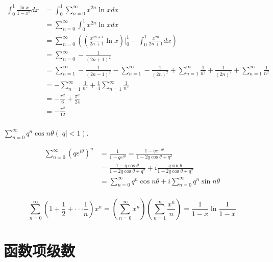   \begin{solution}
    \begin{equation}
  \begin{aligned}
  \int_0^1\frac{\ln x}{1-x^2}dx&=\int_0^1\sum_{n=0}^{\infty}x^{2n}\ln xdx\\
  &=\sum_{n=0}^{\infty}\int_0^1x^{2n}\ln xdx\\
  &=\sum_{n=0}^{\infty}((\frac{x^{2n+1}}{2n+1}\ln x)|_0^1-\int_0^1\frac{x^{2n}}{2n+1}dx)\\
  &=\sum_{n=0}^{\infty}-\frac{1}{(2n+1)^2}\\
  &=\sum_{n=1}^{\infty}-\frac{1}{(2n-1)^2}-\sum_{n=1}^{\infty}-\frac{1}{(2n)^2}+\sum_{n=1}^{\infty}\frac{1}{n^2}+\frac{1}{(2n)^2}+\sum_{n=1}^{\infty}\frac{1}{n^2}\\
  &=-\sum_{n=1}^{\infty}\frac{1}{n^2}+\frac{1}{4}\sum_{n=1}^{\infty}\frac{1}{n^2}\\
  &=-\frac{\pi^2}6+\frac{\pi^2}{24}\\
  &=-\frac{\pi^2}{12}\\
  \end{aligned}
  \end{equation}   
  \end{solution}
  
  \begin{example}
  $\sum_{n=0}^{\infty}q^n\cos n\theta(|q|<1)$.    
  \end{example}  

  \begin{solution}
  \begin{align*}
  \sum_{n=0}^{\infty}(qe^{i\theta})^n&=\frac{1}{1-qe^{i\theta}}=\frac{1-qe^{-i\theta}}{1-2q\cos\theta+q^2}\\
  &=\frac{1-q\cos\theta}{1-2q\cos\theta+q^2}+i\frac{q\sin\theta}{1-2q\cos\theta+q^2}\\
  &=\sum_{n=0}^{\infty}q^n\cos n\theta+i\sum_{n=0}^{\infty}q^n\sin n\theta\\
  \end{align*}   
  \end{solution}
  
\begin{example}
\[
\sum_{n=0}^{\infty}(1+\frac12+\cdot\cdot\cdot\frac1n)x^n
=\left(\sum_{n=0}^{\infty}x^n\right)\left(\sum_{n=1}^{\infty}\frac{x^n}n\right)
=\frac1{1-x}\ln\frac1{1-x}
\]
\end{example} 

  
\section{函数项级数}

